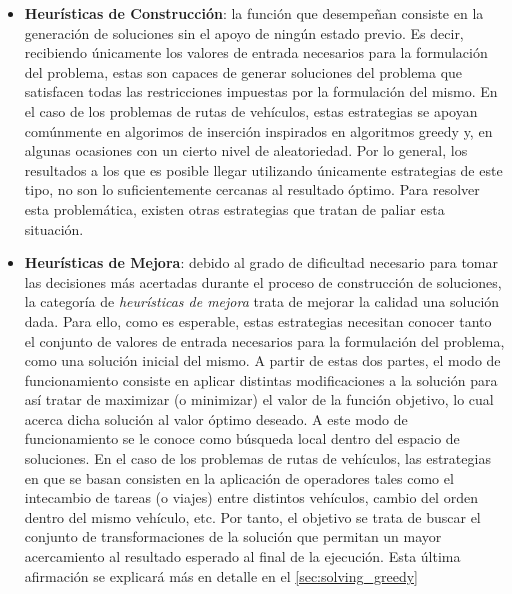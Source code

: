 \documentclass{subfiles}
\begin{document}
      \begin{itemize}
          
          \item \textbf{Heurísticas de Construcción}: la función que desempeñan consiste en la generación de soluciones sin el apoyo de ningún estado previo. Es decir, recibiendo únicamente los valores de entrada necesarios para la formulación del problema, estas son capaces de generar soluciones del problema que satisfacen todas las restricciones impuestas por la formulación del mismo. En el caso de los problemas de rutas de vehículos, estas estrategias se apoyan comúnmente en algorimos de inserción inspirados en algoritmos greedy y, en algunas ocasiones con un cierto nivel de aleatoriedad. Por lo general, los resultados a los que es posible llegar utilizando únicamente estrategias de este tipo, no son lo suficientemente cercanas al resultado óptimo. Para resolver esta problemática, existen otras estrategias que tratan de paliar esta situación.

          \item \textbf{Heurísticas de Mejora}: debido al grado de dificultad necesario para tomar las decisiones más acertadas durante el proceso de construcción de soluciones, la categoría de \emph{heurísticas de mejora} trata de mejorar la calidad una solución dada. Para ello, como es esperable, estas estrategias necesitan conocer tanto el conjunto de valores de entrada necesarios para la formulación del problema, como una solución inicial del mismo. A partir de estas dos partes, el modo de funcionamiento consiste en aplicar distintas modificaciones a la solución para así tratar de maximizar (o minimizar) el valor de la función objetivo, lo cual acerca dicha solución al valor óptimo deseado. A este modo de funcionamiento se le conoce como búsqueda local dentro del espacio de soluciones. En el caso de los problemas de rutas de vehículos, las estrategias en que se basan consisten en la aplicación de operadores tales como el intecambio de tareas (o viajes) entre distintos vehículos, cambio del orden dentro del mismo vehículo, etc. Por tanto, el objetivo se trata de buscar el conjunto de transformaciones de la solución que permitan un mayor acercamiento al resultado esperado al final de la ejecución. Esta última afirmación se explicará más en detalle en el \cref{sec:solving_greedy}
      
      \end{itemize}
\end{document}
